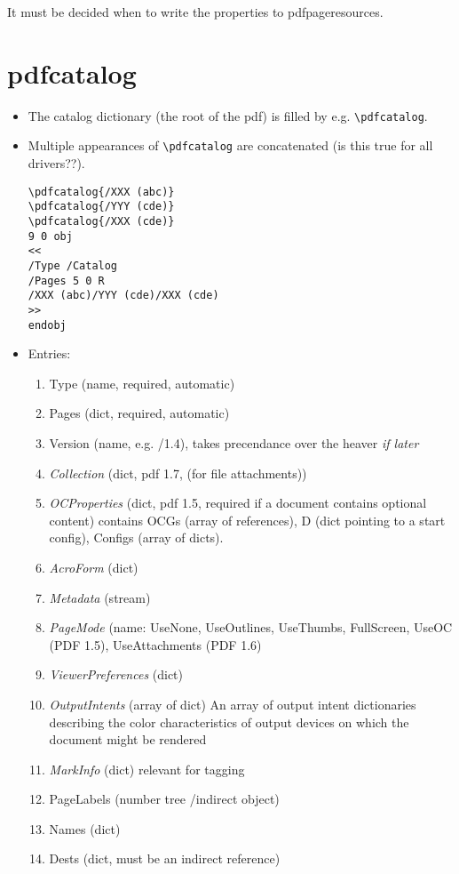 \documentclass{article}
\begin{document}
It must be decided when to write the properties to pdfpageresources.

\section{pdfcatalog}
\begin{itemize}
\item The catalog dictionary (the root of the pdf) is filled by e.g. \verb+\pdfcatalog+.
\item Multiple appearances of  \verb+\pdfcatalog+ are concatenated (is this true for all drivers??).

\begin{verbatim}
\pdfcatalog{/XXX (abc)}
\pdfcatalog{/YYY (cde)}
\pdfcatalog{/XXX (cde)}
9 0 obj
<<
/Type /Catalog
/Pages 5 0 R
/XXX (abc)/YYY (cde)/XXX (cde)
>>
endobj
\end{verbatim}

\item Entries:
\begin{enumerate}
  \item Type (name, required, automatic)
  \item Pages (dict, required, automatic)
  \item Version (name, e.g. /1.4), takes precendance over the heaver \emph{if later}
  \item \emph{Collection} (dict, pdf 1.7, (for file attachments))
  \item \emph{OCProperties} (dict, pdf 1.5, required if a document contains optional content)
        contains OCGs (array of references), D (dict pointing to a start config), Configs (array of dicts).
  \item \emph{AcroForm} (dict)
  \item \emph{Metadata} (stream)
  \item \emph{PageMode} (name: UseNone, UseOutlines, UseThumbs, FullScreen, UseOC (PDF 1.5),
   UseAttachments (PDF 1.6)
  \item \emph{ViewerPreferences} (dict)
  \item \emph{OutputIntents} (array of dict)
  An array of output intent dictionaries describing the color characteristics of output devices on which the document might be rendered
  \item \emph{MarkInfo} (dict) relevant for tagging
  \item PageLabels (number tree /indirect object)
  \item Names (dict)
  \item Dests (dict, must be an indirect reference)


\end{enumerate}
\end{itemize}
\end{document}
